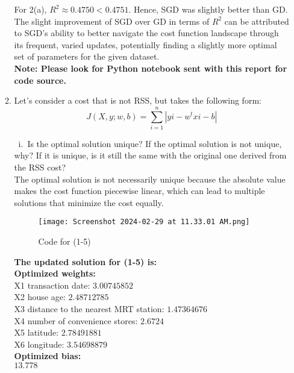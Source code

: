 \documentclass{assignment}
\begin{document}
\begin{problem}
\begin{enumerate}
\begin{enumerate}
    For 2(a), $R^2 \approx 0.4750 <  0.4751$. Hence, SGD was slightly better than GD.\\

    The slight improvement of SGD over GD in terms of $R^2$  can be attributed to SGD's ability to better navigate the cost function landscape through its frequent, varied updates, potentially finding a slightly more optimal set of parameters for the given dataset.\\
    
    \textbf{Note: Please look for Python notebook sent with this report for code source.}\\

    \item Let’s consider a cost that is not RSS, but takes the following form:\\
    $$J(X, y; w, b) = \sum^n_{i=1} |yi - w^t xi - b|$$

    \ i.\ Is the optimal solution unique? If the optimal solution is not unique, why? If it is unique, is it still the same with the original one derived from the RSS cost?\\

    The optimal solution is not necessarily unique because the absolute value makes the cost function piecewise linear, which can lead to multiple solutions that minimize the cost equally. \\

    \begin{figure}[H]
        \centering
        \texttt{[image: Screenshot 2024-02-29 at 11.33.01 AM.png]}
        \caption{Code for (1-5)}
        \label{fig:enter-label}
    \end{figure}

    \textbf{The updated solution for (1-5) is:} \\
    \textbf{Optimized weights: }\\
    X1 transaction date: $3.00745852$\\
    X2 house age: $2.48712785$\\
    X3 distance to the nearest MRT station: $1.47364676$\\
    X4 number of convenience stores: $2.6724$\\
    X5 latitude: $2.78491881$\\
    X6 longitude: $3.54698879$\\

    \textbf{Optimized bias:} \\$13.778$ \\


\end{enumerate}
\end{enumerate}
\end{problem}
\end{document}

